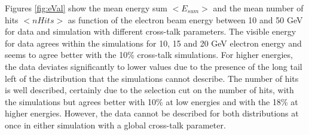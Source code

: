 Figures \ref{fig:eVal} show the mean energy sum $<E_{sum}>$ and the mean number of hits $<nHits>$ as function of the electron beam energy between 10 and 50 GeV for data and simulation with different cross-talk parameters. The visible energy for data agrees within the simulations for 10, 15 and 20 GeV electron energy and seems to agree better with the 10\% cross-talk simulations. For higher energies, the data deviates significantly to lower values due to the presence of the long tail left of the distribution that the simulations cannot describe. The number of hits is well described, certainly due to the selection cut on the number of hits, with the simulations but agrees better with 10\% at low energies and with the 18\% at higher energies. However, the data cannot be described for both distributions at once in either simulation with a global cross-talk parameter.

